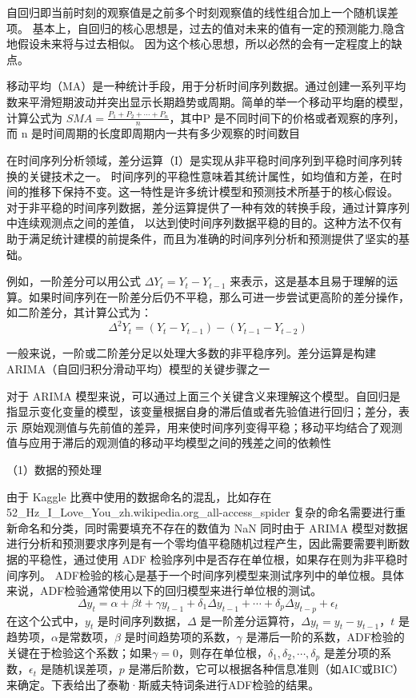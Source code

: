 自回归即当前时刻的观察值是之前多个时刻观察值的线性组合加上一个随机误差项。
基本上，自回归的核心思想是，过去的值对未来的值有一定的预测能力,隐含地假设未来将与过去相似。
因为这个核心思想，所以必然的会有一定程度上的缺点。

移动平均（MA）是一种统计手段，用于分析时间序列数据。通过创建一系列平均数来平滑短期波动并突出显示长期趋势或周期。简单的举一个移动平均磨的模型，计算公式为 $SMA = \frac{P_1 + P_2 + \cdots + P_n}{n}$，其中P 是不同时间下的价格或者观察的序列，
而 n 是时间周期的长度即周期内一共有多少观察的时间数目

在时间序列分析领域，差分运算（I）是实现从非平稳时间序列到平稳时间序列转换的关键技术之一。
时间序列的平稳性意味着其统计属性，如均值和方差，在时间的推移下保持不变。这一特性是许多统计模型和预测技术所基于的核心假设。
对于非平稳的时间序列数据，差分运算提供了一种有效的转换手段，通过计算序列中连续观测点之间的差值，
以达到使时间序列数据平稳的目的。这种方法不仅有助于满足统计建模的前提条件，而且为准确的时间序列分析和预测提供了坚实的基础。

例如，一阶差分可以用公式 $\Delta Y_t = Y_t - Y_{t - 1}$ 来表示，这是基本且易于理解的运算。如果时间序列在一阶差分后仍不平稳，那么可进一步尝试更高阶的差分操作，如二阶差分，其计算公式为：
\begin{equation}
	\Delta^2 Y_t = (Y_t - Y_{t - 1}) - (Y_{t - 1} - Y_{t - 2})
\end{equation}

一般来说，一阶或二阶差分足以处理大多数的非平稳序列。差分运算是构建ARIMA（自回归积分滑动平均）模型的关键步骤之一

对于 ARIMA 模型来说，可以通过上面三个关键含义来理解这个模型。自回归是指显示变化变量的模型，该变量根据自身的滞后值或者先验值进行回归；差分，表示
原始观测值与先前值的差异，用来使时间序列变得平稳；移动平均结合了观测值与应用于滞后的观测值的移动平均模型之间的残差之间的依赖性

（1）数据的预处理

由于 Kaggle 比赛中使用的数据命名的混乱，比如存在 52\_Hz\_I\_Love\_You\_zh.wikipedia.org\_all-access\_spider
复杂的命名需要进行重新命名和分类，同时需要填充不存在的数值为 NaN
同时由于 ARIMA 模型对数据进行分析和预测要求序列是有一个零均值平稳随机过程产生，因此需要需要判断数据的平稳性\cite{赵鹏2020基于}，通过使用 ADF 检验序列中是否存在单位根，如果存在则为非平稳时间序列。
ADF检验的核心是基于一个时间序列模型来测试序列中的单位根。具体来说，ADF检验通常使用以下的回归模型来进行单位根的测试。
\begin{equation}
	\Delta y_t = \alpha + \beta t + \gamma y_{t-1} + \delta_1 \Delta y_{t-1} + \cdots + \delta_p \Delta y_{t-p} + \epsilon_t
\end{equation}
在这个公式中，$y_t$ 是时间序列数据，$\Delta$ 是一阶差分运算符，$\Delta y_t = y_t - y_{t-1}$，$t$ 是趋势项，$\alpha$是常数项，$\beta$ 是时间趋势项的系数，$\gamma$ 是滞后一阶的系数，ADF检验的关键在于检验这个系数；如果$\gamma = 0$，则存在单位根，$\delta_1, \delta_2, \cdots, \delta_p$ 是差分项的系数，$\epsilon_t$ 是随机误差项，$p$ 是滞后阶数，它可以根据各种信息准则（如AIC或BIC）来确定。下表给出了泰勒·斯威夫特词条进行ADF检验的结果。


